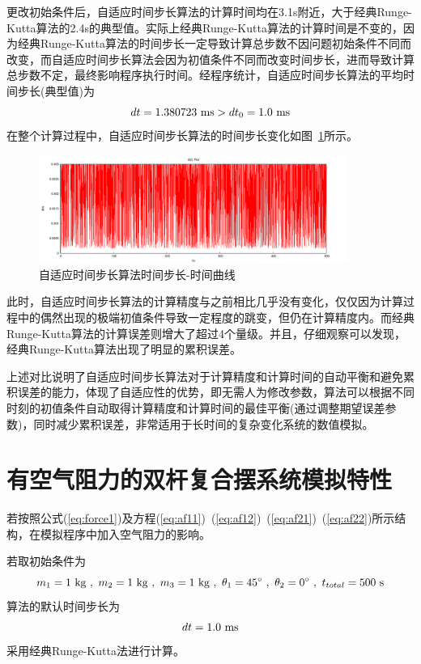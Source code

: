 \documentclass[a4paper,12pt,titlepage]{article}
\begin{document}
更改初始条件后，自适应时间步长算法的计算时间均在3.1s附近，大于经典Runge-Kutta算法的2.4s的典型值。实际上经典Runge-Kutta算法的计算时间是不变的，因为经典Runge-Kutta算法的时间步长一定导致计算总步数不因问题初始条件不同而改变，而自适应时间步长算法会因为初值条件不同而改变时间步长，进而导致计算总步数不定，最终影响程序执行时间。经程序统计，自适应时间步长算法的平均时间步长(典型值)为
\begin{equation}
	dt=1.380723 ~\mathrm{ms} > dt_0=1.0 ~\mathrm{ms} \notag
\end{equation}
在整个计算过程中，自适应时间步长算法的时间步长变化如图~\ref{fig:RKAdt_4}所示。
\begin{figure}[H]
\centering
\includegraphics[width=0.9\textwidth]{./RKAdt_4.pdf}
\caption[Caption for LOF]{自适应时间步长算法时间步长-时间曲线}
\label{fig:RKAdt_4}
\end{figure}

此时，自适应时间步长算法的计算精度与之前相比几乎没有变化，仅仅因为计算过程中的偶然出现的极端初值条件导致一定程度的跳变，但仍在计算精度内。而经典Runge-Kutta算法的计算误差则增大了超过4个量级。并且，仔细观察可以发现，经典Runge-Kutta算法出现了明显的累积误差。

上述对比说明了自适应时间步长算法对于计算精度和计算时间的自动平衡和避免累积误差的能力，体现了自适应性的优势，即无需人为修改参数，算法可以根据不同时刻的初值条件自动取得计算精度和计算时间的最佳平衡(通过调整期望误差参数)，同时减少累积误差，非常适用于长时间的复杂变化系统的数值模拟。

\section{有空气阻力的双杆复合摆系统模拟特性}
若按照公式(\ref{eq:force1})及方程(\ref{eq:af11})~(\ref{eq:af12})~(\ref{eq:af21})~(\ref{eq:af22})所示结构，在模拟程序中加入空气阻力的影响。

若取初始条件为
\begin{equation}
	m_1=1~\mathrm{kg} ~,~ m_2=1~\mathrm{kg} ~,~ m_3=1~\mathrm{kg} ~,~ \theta_1=45^{\circ} ~,~ \theta_2=0^{\circ} ~,~ t_{total}=500 ~\mathrm{s} \notag
\end{equation}
算法的默认时间步长为
\begin{equation}
	dt=1.0 ~\mathrm{ms} \notag
\end{equation}
采用经典Runge-Kutta法进行计算。
\end{document}
